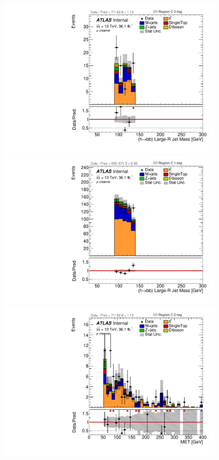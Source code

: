 \begin{figure}[!htbp]
\begin{center}
\includegraphics[scale=0.33]{./figures/boosted/ABCD_ScaledPrompt/muon_SR_RegionC_HbbMass}  
\includegraphics[scale=0.33]{./figures/boosted/ABCD_ScaledPrompt/muon_SR_RegionC_1tag_HbbMass}\\
\includegraphics[scale=0.33]{./figures/boosted/ABCD_ScaledPrompt/muon_SR_RegionC_MET}       

\end{center}
\end{figure}
